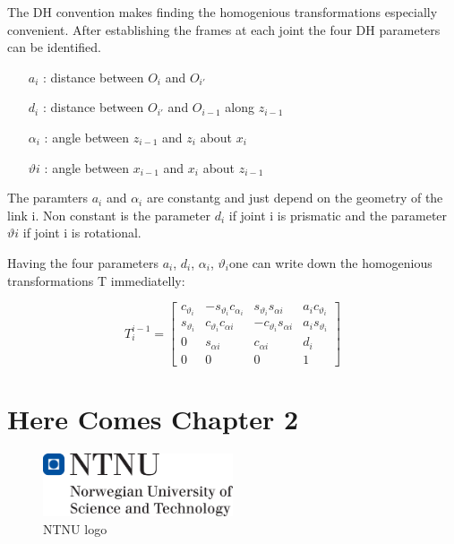 \documentclass{tpk4170report}
\begin{document}
The DH convention makes finding the homogenious transformations especially convenient. After establishing the frames at each joint the four DH parameters can be identified. 

\begin{itemize}
  \item[\(a_{i}\)]: distance between \(O_{i}\) and \(O_{i'}\) 
  \item[\(d_{i}\)]: distance between \(O_{i'}\) and \(O_{i-1}\) along \(z_{i-1}\)
  \item[\(\alpha_{i}\)]: angle between \(z_{i-1}\) and \(z_{i}\) about \(x_{i}\)
  \item[\(\vartheta{i}\)]:  angle between \(x_{i-1}\) and \(x_{i}\) about \(z_{i-1}\)
\end{itemize}

The paramters \(a_{i}\) and \(\alpha_{i}\) are constantg and just depend on the geometry of the link i. Non constant is the parameter \(d_{i}\) if joint i is prismatic and the parameter \(\vartheta{i}\) if joint i is rotational.

Having the four parameters \(a_{i}\), \(d_{i}\), \(\alpha_{i}\), \(\vartheta_{i}\)one can write down the homogenious transformations T immediatelly: 

\begin{equation}
  T_{i}^{i-1}= 
  \begin{bmatrix}
    c_{\vartheta_{i}} & -s_{\vartheta_{i}}c_{\alpha_{i}} &  s_{\vartheta_{i}}s_{\alpha{i}} & a_{i}c_{\vartheta_{i}} \\
    s_{\vartheta_{i}} & c_{\vartheta_{i}}c_{\alpha{i}} & -c_{\vartheta_{i}}s_{\alpha{i}} & a_{i}s_{\vartheta_{i}} \\
    0 & s_{\alpha{i}} & c_{\alpha{i}} & d_{i} \\
    0 & 0 & 0 & 1
  \end{bmatrix}
  \label{eqn:Transformation_Denavit_Hartenberg}
\end{equation}
\chapter{Here Comes Chapter 2}

\Blindtext

\begin{figure}
  \centering
  \includegraphics[width=0.5\textwidth]{hovedlogo} 
  \caption{NTNU logo}
  \label{fig:logo2}
\end{figure}
\end{document}
